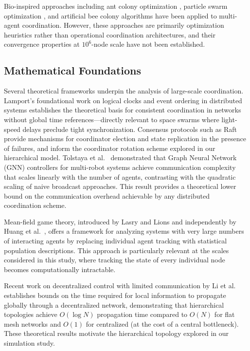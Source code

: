 \documentclass[journal]{IEEEtran}
\begin{document}
Bio-inspired approaches including ant colony optimization \cite{dorigo_aco}, particle swarm optimization \cite{kennedy_pso}, and artificial bee colony algorithms \cite{karaboga_abc} have been applied to multi-agent coordination. However, these approaches are primarily optimization heuristics rather than operational coordination architectures, and their convergence properties at $10^6$-node scale have not been established.

\subsection{Mathematical Foundations}

Several theoretical frameworks underpin the analysis of large-scale coordination. Lamport's foundational work on logical clocks and event ordering in distributed systems \cite{lamport_clocks} establishes the theoretical basis for consistent coordination in networks without global time references---directly relevant to space swarms where light-speed delays preclude tight synchronization. Consensus protocols such as Raft \cite{ongaro_raft} provide mechanisms for coordinator election and state replication in the presence of failures, and inform the coordinator rotation scheme explored in our hierarchical model. Tolstaya et al.~\cite{tolstaya_gnn} demonstrated that Graph Neural Network (GNN) controllers for multi-robot systems achieve communication complexity that scales linearly with the number of agents, contrasting with the quadratic scaling of naive broadcast approaches. This result provides a theoretical lower bound on the communication overhead achievable by any distributed coordination scheme.

Mean-field game theory, introduced by Lasry and Lions \cite{lasry_mfg} and independently by Huang et al.~\cite{huang_mfg}, offers a framework for analyzing systems with very large numbers of interacting agents by replacing individual agent tracking with statistical population descriptions. This approach is particularly relevant at the scales considered in this study, where tracking the state of every individual node becomes computationally intractable.

Recent work on decentralized control with limited communication by Li et al.~\cite{li_decentralized} establishes bounds on the time required for local information to propagate globally through a decentralized network, demonstrating that hierarchical topologies achieve $O(\log N)$ propagation time compared to $O(N)$ for flat mesh networks and $O(1)$ for centralized (at the cost of a central bottleneck). These theoretical results motivate the hierarchical topology explored in our simulation study.
\end{document}

